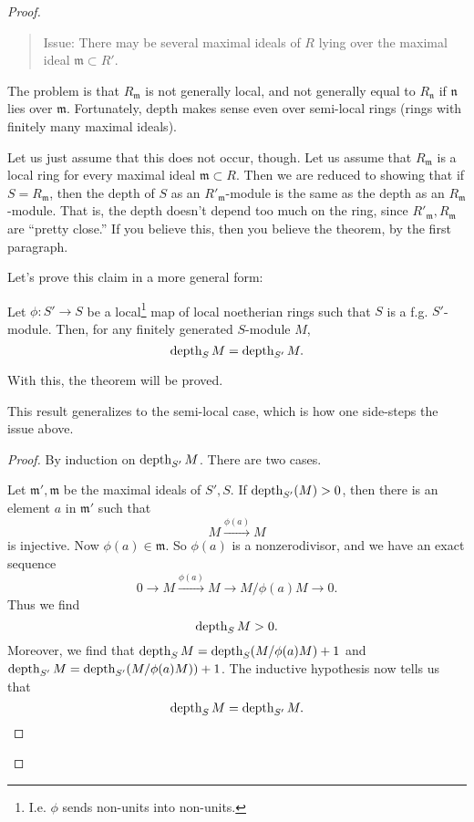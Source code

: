 \begin{example}
\begin{proof}
\begin{quote}
Issue: There may be several maximal ideals of $R$ lying over the
maximal ideal
$\mathfrak{m} \subset R'$.
\end{quote}

The problem is that $R_{\mathfrak{m}}$ is not generally local,
and not
generally equal to $R_{\mathfrak{n}}$ if $\mathfrak{n}$ lies
over
$\mathfrak{m}$. Fortunately, depth makes sense even over
semi-local rings
(rings with finitely many maximal ideals).

Let us just assume that this does not occur, though. Let us
assume that
$R_{\mathfrak{m}}$ is a local ring for every maximal ideal
$\mathfrak{m}
\subset R$. Then we are reduced to showing that if $S =
R_{\mathfrak{m}}$,
then the depth of $S$ as an $R'_{\mathfrak{m}}$-module is the
same as the
depth as an $R_{\mathfrak{m}}$-module. That is, the depth
doesn't depend too
much on the ring, since $R'_{\mathfrak{m}}, R_{\mathfrak{m}}$
are ``pretty
close.'' If you believe this, then you believe the theorem, by
the first
paragraph.


Let's prove this claim in a more general form:

\begin{proposition}
Let $\phi: S' \to S$ be a local\footnote{I.e. $\phi$ sends
non-units into
non-units.} map of local noetherian rings such that $S$ is a
f.g.
$S'$-module. Then, for any finitely generated $S$-module $M$,
\[ \operatorname{depth}_S M = \operatorname{depth}_{S'} M.  \]
\end{proposition}
With this, the theorem will be proved.

\begin{remark}
This result generalizes to the semi-local case, which is how
one side-steps
the issue above.
\end{remark}

\begin{proof}
By induction on $\operatorname{depth}_{S'} M$. There are two cases.

Let $\mathfrak{m}', \mathfrak{m}$ be the maximal ideals of $S',
S$.
If $\operatorname{depth}_{S'}(M) >0$, then there is an element $a$ in
$\mathfrak{m}'$ such
that
\[ M \stackrel{\phi(a)}{\to} M \]
is injective. Now $\phi(a) \in \mathfrak{m}$. So $\phi(a)$ is a
nonzerodivisor, and we have an exact sequence
\[ 0 \to M \stackrel{\phi(a)}{\to} M \to M/\phi(a) M \to 0.  \]
Thus we find
\[ \operatorname{depth}_{S} M > 0 . \]
Moreover, we find that $\operatorname{depth}_S M = \operatorname{depth}_S (M/\phi(a) M) +1$
and
$\operatorname{depth}_{S'} M = \operatorname{depth}_{S'}(M/\phi(a) M))+1$. The inductive
hypothesis now
tells us that
\[ \operatorname{depth}_S M = \operatorname{depth}_{S'}M.  \]


\end{proof}
\end{proof}
\end{example}
